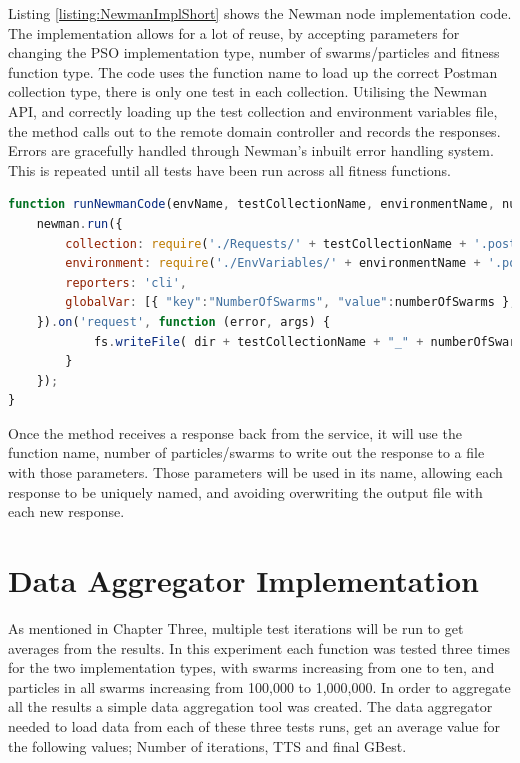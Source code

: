 \documentclass[oneside,12pt]{book}
\begin{document}
Listing \ref{listing:NewmanImplShort} shows the Newman node implementation code. The implementation allows for a lot of reuse, by accepting parameters for changing the PSO implementation type, number of swarms/particles and fitness function type. The code uses the function name to load up the correct Postman collection type, there is only one test in each collection. Utilising the Newman API, and correctly loading up the test collection and environment variables file, the method calls out to the remote domain controller and records the responses. Errors are gracefully handled through Newman's inbuilt error handling system. This is repeated until all tests have been run across all fitness functions. 

\begin{lstlisting}[basicstyle=\footnotesize, language=JavaScript]
function runNewmanCode(envName, testCollectionName, environmentName, numberOfSwarms, numberOfParticles, baseUrlsSting, endpoint) {
    newman.run({
        collection: require('./Requests/' + testCollectionName + '.postman_collection.json'),
        environment: require('./EnvVariables/' + environmentName + '.postman_environment.json'),
        reporters: 'cli',
        globalVar: [{ "key":"NumberOfSwarms", "value":numberOfSwarms }, {"key":"endpoint", "value": endpoint}, { "key":"NumberOfParticles", "value": numberOfParticles}, { "key":"BaseUrls", "value": baseUrlsSting}]
    }).on('request', function (error, args) {
            fs.writeFile( dir + testCollectionName + "_" + numberOfSwarms + "_" + numberOfParticles + '.result.json', args.response.stream, function (error)
        }
    });
}
\end{lstlisting}
\label{listing:NewmanImplShort}

Once the method receives a response back from the service, it will use the function name, number of particles/swarms to write out the response to a file with those parameters. Those parameters will be used in its name, allowing each response to be uniquely named, and avoiding overwriting the output file with each new response. 

\section{Data Aggregator Implementation}
As mentioned in Chapter Three, multiple test iterations will be run to get averages from the results. In this experiment each function was tested three times for the two implementation types, with swarms increasing from one to ten, and particles in all swarms increasing from 100,000 to 1,000,000. In order to aggregate all the results a simple data aggregation tool was created. The data aggregator needed to load data from each of these three tests runs, get an average value for the following values; Number of iterations, TTS and final GBest. 
\end{document}

